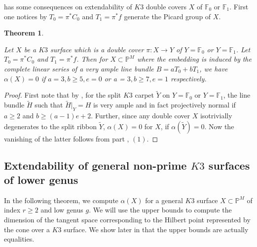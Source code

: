 \documentclass[11pt,twoside]{amsart}
\theoremstyle{plain}
\numberwithin{equation}{section}
\newtheorem{theorem}{Theorem}[section]
\theoremstyle{definition}
\begin{document}
 has some consequences on extendability of $K3$ double covers $X$ of $\mathbb{F}_0$ or $\mathbb{F}_1$. First one notices by $T_0 = \pi^*C_0$ and $T_1 = \pi^*f$ generate the Picard group of $X$. 

\begin{theorem}\label{rank two}

Let $X$ be a $K3$ surface which is a double cover $\pi: X \to Y$ of $Y = \mathbb{F}_0$ or $Y = \mathbb{F}_1$. Let $T_0 = \pi^*C_0$ and $T_1 = \pi^*f$. Then for $X \subset \mathbb{P}^M$ where the embedding is induced by the complete linear series of a very ample line bundle $B = aT_0+bT_1$, we have $\alpha(X) = 0$ if $a = 3, b \geq 5, e = 0$ or a = $3, b \geq 7, e = 1$ respectively.

\end{theorem}

\begin{proof}
    First note that by \cite[Proposition $2.1$]{DM24}, for the split $K3$ carpet $\widetilde{Y}$ on $Y = \mathbb{F}_0$ or $Y = \mathbb{F}_1$, the line bundle $\widetilde{H}$ such that $\widetilde{H}|_Y = H$ is very ample and in fact projectively normal if $a \geq 2$ and $b \geq (a-1)e+2$. Further, since any double cover $X$ isotrivially degenerates to the split ribbon $\widetilde{Y}$, $\alpha(X) = 0$ for $X$, if $\alpha(\widetilde{Y}) = 0$. Now the vanishing of the latter follows from part , $(1)$.
\end{proof}



\subsection{Extendability of general non-prime $K3$ surfaces of lower genus}

In the following theorem, we compute $\alpha(X)$ for a general $K3$ surface $X \subset \mathbb{P}^M$ of index $r \geq 2$ and low genus $g$. We will use the upper bounds to compute the dimension of the tangent space corresponding to the Hilbert point represented by the cone over a $K3$ surface. We show later in  that the upper bounds are actually equalities. 
\end{document}
